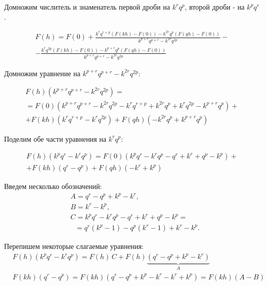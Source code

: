 \documentclass[oneside,final,12pt]{article}
\begin{document}
\bigskip
Домножим числитель и знаменатель первой дроби на $k^r q^p$, второй дроби - на $k^p q^r$.

\begin{equation*}
\begin{gathered}
F(h) = F(0) + \frac{k^r q^{r+p} (F(kh)-F(0)) - k^{2r} q^p (F(qh)-F(0))}{k^{p+r} q^{p+r} - k^{2r} q^{2p}} - \\
- \frac{k^r q^{2p} (F(kh)-F(0)) - k^{p+r} q^p (F(qh)-F(0))}{k^{p+r} q^{p+r} - k^{2r} q^{2p}}
\end{gathered}
\end{equation*}

\bigskip
Домножим уравнение на $k^{p+r} q^{p+r} - k^{2r} q^{2p}$:

\begin{equation*}
\begin{gathered}
F(h) (k^{p+r} q^{p+r} - k^{2r} q^{2p}) = \\
= F(0) (k^{p+r} q^{p+r} - k^{2r} q^{2p} - k^r q^{r+p} + k^{2r} q^p + k^r q^{2p} - k^{p+r} q^p)+\\
+ F(kh) (k^r q^{r+p}-k^r q^{2p}) + F(qh) (-k^{2r} q^p + k^{p+r} q^p)
\end{gathered}
\end{equation*}

\bigskip
Поделим обе части уравнения на $k^r q^p$:

\begin{equation*}
\begin{gathered}
F(h) (k^p q^r - k^r q^p) =
F(0) (k^p q^r - k^r q^p - q^r + k^r + q^p - k^p)+ \\
+  F(kh) (q^r - q^p) + F(qh) (-k^r + k^p)
\end{gathered}
\end{equation*}

\bigskip
Введем несколько обозначений:
\begin{align*}
& A = q^r - q^p + k^p - k^r, \\
& B = k^r - k^p, \\
& C = k^p q^r - k^r q^p - q^r + k^r + q^p - k^p = \\
& \, \ \ = q^r (k^p - 1) - q^p (k^r - 1) + k^r - k^p.
\end{align*}

\bigskip
Перепишем некоторые слагаемые уравнения:
\begin{align*}
& F(h) (k^p q^r - k^r q^p) = F(h) \, C + F(h) \underbrace{(q^r-q^p+k^p-k^r)}_{A} \\
& F(kh) (q^r - q^p) = F(kh) (q^r-q^p+k^p-k^r-k^r+k^p) = F(kh) (A-B)
\end{align*}
\end{document}
